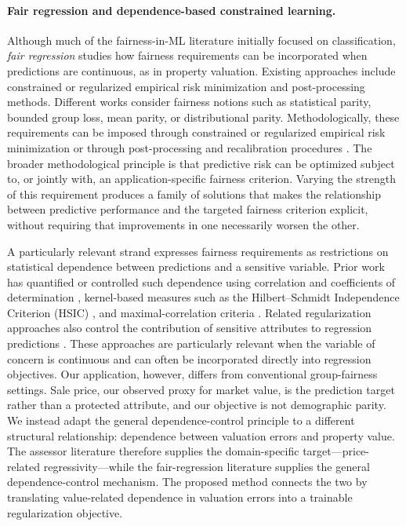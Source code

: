 \documentclass[10pt]{article}
\theoremstyle{definition}
\newcommand{\1}{\mathbf{1}}
\begin{document}
\paragraph{Fair regression and dependence-based constrained learning.}
Although much of the fairness-in-ML literature initially focused on classification, \emph{fair regression} studies how fairness requirements can be incorporated when predictions are continuous, {as in property valuation}. Existing approaches include constrained or regularized empirical risk minimization and post-processing methods. {Different works consider fairness notions such as statistical parity, bounded group loss, mean parity, or distributional parity. Methodologically, these requirements can be imposed through constrained or regularized empirical risk minimization or through post-processing and recalibration procedures} \cite{AgarwalDudikWu2019,FitzsimonsEtAl2019,ChzhenEtAl2020Wasserstein,ChzhenEtAl2020Recalibration,WeiEtAl2023}. {The broader methodological principle is that predictive risk can be optimized subject to, or jointly with, an application-specific fairness criterion. Varying the strength of this requirement produces a family of solutions that makes the relationship between predictive performance and the targeted fairness criterion explicit, without requiring that improvements in one necessarily worsen the other.}

{A particularly relevant strand expresses fairness requirements as restrictions on statistical dependence between predictions and a sensitive variable.} {Prior work has quantified or controlled such dependence using correlation and coefficients of determination \cite{KomiyamaEtAl2018}, kernel-based measures such as the Hilbert--Schmidt Independence Criterion (HSIC) \cite{PerezSuayEtAl2017,LiEtAl2022Fairness}, and maximal-correlation criteria \cite{MaryEtAl2019,lee2022maximal}. Related regularization approaches also control the contribution of sensitive attributes to regression predictions \cite{ScutariPaneroProissl2022}.} {These approaches are particularly relevant when the variable of concern is continuous and can often be incorporated directly into regression objectives. Our application, however, differs from conventional group-fairness settings. Sale price, our observed proxy for market value, is the prediction target rather than a protected attribute, and our objective is not demographic parity. We instead adapt the general dependence-control principle to a different structural relationship: dependence between valuation errors and property value.} {The assessor literature therefore supplies the domain-specific target---price-related regressivity---while the fair-regression literature supplies the general dependence-control mechanism. The proposed method connects the two by translating value-related dependence in valuation errors into a trainable regularization objective.}
\end{document}
